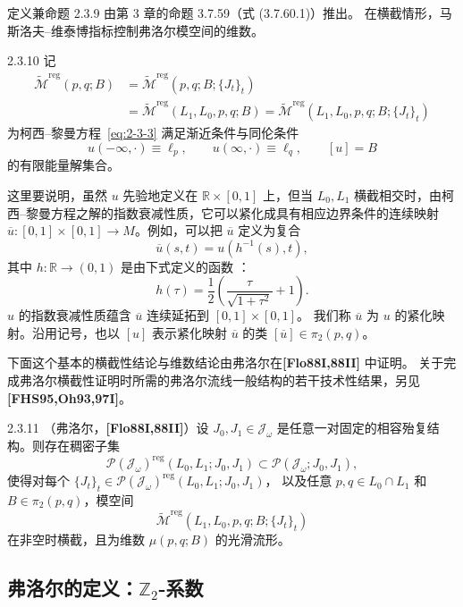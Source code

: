 定义兼命题 2.3.9 由第 3 章的命题 3.7.59（式 (3.7.60.1)）推出。
在横截情形，马斯洛夫--维泰博指标控制弗洛尔模空间的维数。

\begin{definition}{2.3.10}\label{def:2-3-10}
记
\[
  \begin{split}
  \widetilde{\mathcal M}^{\mathrm{reg}}(p,q;B)
  &=\widetilde{\mathcal M}^{\mathrm{reg}}
      (p,q;B;\{J_t\}_t)\\
  &=\widetilde{\mathcal M}^{\mathrm{reg}}(L_1,L_0,p,q;B)
   =\widetilde{\mathcal M}^{\mathrm{reg}}
      (L_1,L_0,p,q;B;\{J_t\}_t)
  \end{split}
\]
为柯西--黎曼方程~\eqref{eq:2-3-3} 满足渐近条件与同伦条件
\[
  u(-\infty,\mathord\cdot)\equiv\ell_p,
  \qquad
  u(\infty,\mathord\cdot)\equiv\ell_q,
  \qquad
  [u]=B
\]
的有限能量解集合。

这里要说明，虽然 $u$ 先验地定义在 $\mathbb R\times[0,1]$ 上，但当
$L_0,L_1$ 横截相交时，由柯西--黎曼方程之解的指数衰减性质，它可以紧化成具有相应边界条件的连续映射
$\overline u:[0,1]\times[0,1]\to M$。例如，可以把 $\overline u$ 定义为复合
\[
  \overline u(s,t)=u(h^{-1}(s),t),
\]
其中 $h:\mathbb R\to(0,1)$ 是由下式定义的函数
：
\[
  h(\tau)=\frac12\left(\frac{\tau}{\sqrt{1+\tau^2}}+1\right).
\]
$u$ 的指数衰减性质蕴含 $\overline u$ 连续延拓到 $[0,1]\times[0,1]$。
我们称 $\overline u$ 为 $u$ 的紧化映射。沿用记号，也以 $[u]$ 表示紧化映射
$\overline u$ 的类 $[\overline u]\in\pi_2(p,q)$。
\end{definition}

下面这个基本的横截性结论与维数结论由弗洛尔在\textbf{[Flo88I,88II]} 中证明。
关于完成弗洛尔横截性证明时所需的弗洛尔流线一般结构的若干技术性结果，另见
\textbf{[FHS95,Oh93,97I]}。

\begin{theorem}{2.3.11}\label{thm:2-3-11}
（弗洛尔，\textbf{[Flo88I,88II]}）设
$J_0,J_1\in\mathcal J_\omega$ 是任意一对固定的相容殆复结构。则存在稠密子集
\[
  \mathcal P(\mathcal J_\omega)^{\mathrm{reg}}(L_0,L_1;J_0,J_1)
  \subset\mathcal P(\mathcal J_\omega;J_0,J_1),
\]
使得对每个
$\{J_t\}_t\in
\mathcal P(\mathcal J_\omega)^{\mathrm{reg}}(L_0,L_1;J_0,J_1)$，
以及任意 $p,q\in L_0\cap L_1$ 和 $B\in\pi_2(p,q)$，模空间
\[
  \widetilde{\mathcal M}^{\mathrm{reg}}
    (L_1,L_0,p,q;B;\{J_t\}_t)
\]
在非空时横截，且为维数 $\mu(p,q;B)$ 的光滑流形。
\end{theorem}

\subsection{弗洛尔的定义：\texorpdfstring{$\mathbb Z_2$}{Z2}-系数}
\label{sec:2-3-2}

